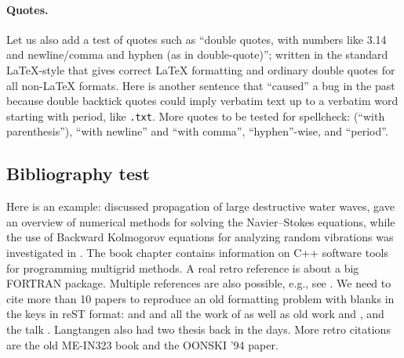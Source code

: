 \documentclass[%
oneside,                 %
final,                   %
10pt]{article}
\newenvironment{doconceexercise}{}{}
\newcounter{doconceexercisecounter}
\theoremstyle{definition}
\begin{document}
\begin{enumerate}
\eccq

\paragraph{Quotes.}
Let us also add a test of quotes such as ``double quotes, with numbers
like 3.14 and newline/comma and hyphen (as in double-quote)''; written
in the standard LaTeX-style that gives correct {\LaTeX} formatting and
ordinary double quotes for all non-LaTeX formats.  Here is another
sentence that ``caused'' a bug in the past because double backtick
quotes could imply verbatim text up to a verbatim word starting with
period, like \texttt{.txt}.
More quotes to be tested for spellcheck:
(``with parenthesis''), ``with newline''
and ``with comma'', ``hyphen''-wise, and ``period''.
\subsection{Bibliography test}
Here is an example: \cite{Langtangen_Pedersen_2002} discussed propagation of
large destructive water waves, \cite{Langtangen_et_al_2002} gave
an overview of numerical methods for solving the Navier--Stokes equations,
while the use of Backward Kolmogorov equations for analyzing
random vibrations was investigated in \cite{Langtangen_1994a}.
The book chapter \cite{Mardal_et_al_2003a} contains information on
C++ software tools for programming multigrid methods. A real retro
reference is \cite{Langtangen_1988d} about a big FORTRAN package.
Multiple references are also possible, e.g., see
\cite{Langtangen_Pedersen_2002,Mardal_et_al_2003a}.
We need to cite more than 10 papers to reproduce an old formatting
problem with blanks in the keys in reST format:
\cite{Langtangen_1992c,Langtangen_1994a,Mortensen_et_al_2011,Langtangen_Pedersen_2002}
and
\cite{Langtangen_et_al_2002,Glimsdal_et_al_20006,Rahman_et_al_2006b,Haga_et_al_2011a,Langtangen_2003a,Langtangen_2008a,Langtangen:95}
and all the work of
\cite{Langtangen_2012,Mardal_et_al_2003a,Jeberg_et_al_2004} as well as
old work \cite{Langtangen_1988d} and \cite{Langtangen_1989e}, and the
talk \cite{Langtangen_talk_2007a}.
Langtangen also had two thesis \cite{Langtangen:85,Langtangen_1989e}
back in the days.
More retro citations are
the old ME-IN323 book \cite{Langtangen:91} and the
\cite{Langtangen:94b} OONSKI '94 paper.
\begin{doconceexercise}
                             

\end{doconceexercise}
\end{enumerate}
\end{document}
